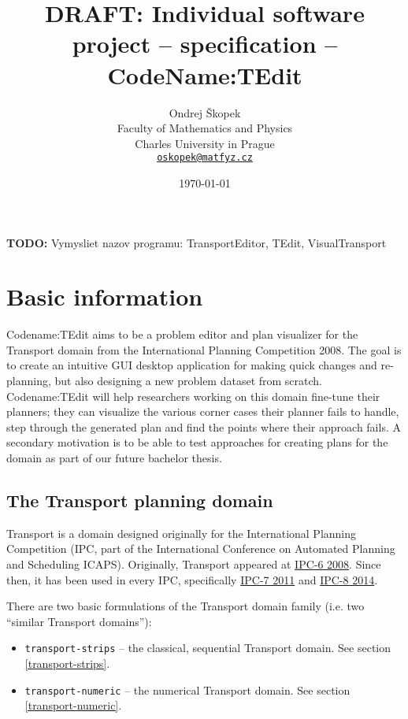 \documentclass[10pt,a4paper,oneside]{article}
\author{Ondrej Škopek\\
Faculty of Mathematics and Physics\\
Charles University in Prague\\
\texttt{\href{mailto:oskopek@matfyz.cz}{oskopek@matfyz.cz}}}
\title{\textbf{DRAFT:} Individual software project -- specification -- CodeName:TEdit}
\date{\today}
\newcommand{\TODO}[1]{{\textbf{TODO:} #1}} %
\newcommand{\pname}{Codename:TEdit } %
\begin{document}
\maketitle

\TODO Vymysliet nazov programu: TransportEditor, TEdit, VisualTransport











\section{Basic information}

\pname aims to be a problem editor and plan visualizer for the Transport domain from the International Planning Competition 2008.
The goal is to create an intuitive GUI desktop application for making quick changes and re-planning, but also designing a new problem dataset from scratch. \pname will help researchers working on this domain fine-tune their planners; they can visualize the various corner cases their planner fails to handle, step through the generated plan and find the points where their approach fails.
A secondary motivation is to be able to test approaches for creating plans for the domain as part of our future bachelor thesis.

\subsection{The Transport planning domain}

Transport is a domain designed originally for the International Planning Competition (IPC, part of the International Conference on Automated Planning and Scheduling ICAPS).
Originally, Transport appeared at \href{http://icaps-conference.org/ipc2008/deterministic/Domains.html}{IPC-6 2008}.
Since then, it has been used in every IPC, specifically \href{http://www.plg.inf.uc3m.es/ipc2011-deterministic/}{IPC-7 2011}
and \href{https://helios.hud.ac.uk/scommv/IPC-14/}{IPC-8 2014}.

There are two basic formulations of the Transport domain family (i.e. two ``similar Transport domains''):
\begin{itemize}
\item \verb+transport-strips+ -- the classical, sequential Transport domain. See section \ref{transport-strips}.
\item \verb+transport-numeric+ -- the numerical Transport domain. See section \ref{transport-numeric}.
\end{itemize}
\end{document}
